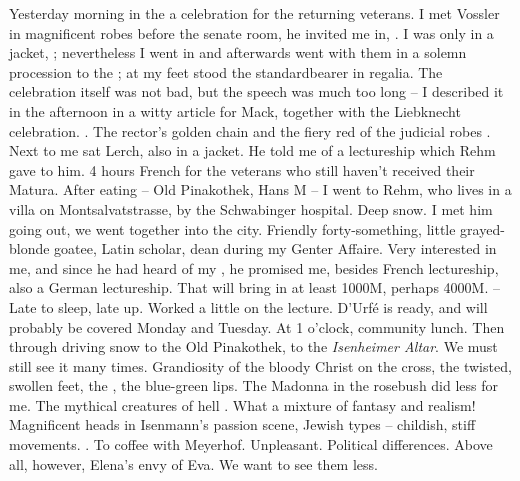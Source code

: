 Yesterday morning in the  a celebration for the returning veterans. I met Vossler in magnificent robes before the senate room, he invited me in, . I was only in a jacket, ; nevertheless I went in and afterwards went with them in a solemn procession to the ; at my feet stood the standardbearer in regalia. The celebration itself  was not bad, but the speech was much too long -- I described it in the afternoon in a witty article for Mack, together with the Liebknecht celebration. . The rector's golden chain and the fiery red of the judicial robes . Next to me sat Lerch, also in a jacket. He told me of a lectureship which Rehm gave to him. 4 hours French for the veterans who still haven't received their Matura. After eating -- Old Pinakothek, Hans M -- I went to Rehm, who lives in a villa on Montsalvatstrasse, by the Schwabinger hospital. Deep snow. I met him going out, we went together into the city. Friendly forty-something, little grayed-blonde goatee, Latin scholar, dean during my Genter Affaire. Very interested in me, and since he had heard of my , he promised me, besides French lectureship, also a German lectureship. That will bring in at least 1000M, perhaps 4000M. \missing -- Late to sleep, late up. Worked a little on the lecture. D'Urfé is ready, and will probably be covered Monday and Tuesday. At 1 o'clock, community lunch. Then through driving snow to the Old Pinakothek, to the \textit{Isenheimer Altar}. We must still see it many times. Grandiosity of the bloody  Christ on the cross, the twisted, swollen feet, the , the blue-green lips. The Madonna in the rosebush did less for me. The mythical creatures of hell . What a mixture of fantasy and realism! Magnificent heads in Isenmann's passion scene, Jewish types -- childish, stiff movements. . To coffee with Meyerhof. Unpleasant. Political differences. Above all, however, Elena's envy of Eva. We want to see them less.

